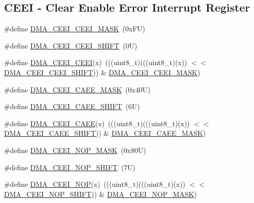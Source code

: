 \subsection*{C\+E\+EI -\/ Clear Enable Error Interrupt Register}
\begin{DoxyCompactItemize}
\item 
\#define \mbox{\hyperlink{group___d_m_a___register___masks_gaac1e3fb6ff551f58fe6c43c5b10a6186}{D\+M\+A\+\_\+\+C\+E\+E\+I\+\_\+\+C\+E\+E\+I\+\_\+\+M\+A\+SK}}~(0x\+F\+U)
\item 
\#define \mbox{\hyperlink{group___d_m_a___register___masks_ga66ffe3efeb446f55654d3ac90abf1cb6}{D\+M\+A\+\_\+\+C\+E\+E\+I\+\_\+\+C\+E\+E\+I\+\_\+\+S\+H\+I\+FT}}~(0\+U)
\item 
\#define \mbox{\hyperlink{group___d_m_a___register___masks_gaf1db6175a973e40e11a4ac87ee231096}{D\+M\+A\+\_\+\+C\+E\+E\+I\+\_\+\+C\+E\+EI}}(x)~(((uint8\+\_\+t)(((uint8\+\_\+t)(x)) $<$$<$ \mbox{\hyperlink{group___d_m_a___register___masks_ga66ffe3efeb446f55654d3ac90abf1cb6}{D\+M\+A\+\_\+\+C\+E\+E\+I\+\_\+\+C\+E\+E\+I\+\_\+\+S\+H\+I\+FT}})) \& \mbox{\hyperlink{group___d_m_a___register___masks_gaac1e3fb6ff551f58fe6c43c5b10a6186}{D\+M\+A\+\_\+\+C\+E\+E\+I\+\_\+\+C\+E\+E\+I\+\_\+\+M\+A\+SK}})
\item 
\#define \mbox{\hyperlink{group___d_m_a___register___masks_ga386c3018389f0adce8b163c90bc171b7}{D\+M\+A\+\_\+\+C\+E\+E\+I\+\_\+\+C\+A\+E\+E\+\_\+\+M\+A\+SK}}~(0x40\+U)
\item 
\#define \mbox{\hyperlink{group___d_m_a___register___masks_ga389695175eaab975f78ed66669e467df}{D\+M\+A\+\_\+\+C\+E\+E\+I\+\_\+\+C\+A\+E\+E\+\_\+\+S\+H\+I\+FT}}~(6\+U)
\item 
\#define \mbox{\hyperlink{group___d_m_a___register___masks_gab4d8578d0b4f25e873beb3311698ec19}{D\+M\+A\+\_\+\+C\+E\+E\+I\+\_\+\+C\+A\+EE}}(x)~(((uint8\+\_\+t)(((uint8\+\_\+t)(x)) $<$$<$ \mbox{\hyperlink{group___d_m_a___register___masks_ga389695175eaab975f78ed66669e467df}{D\+M\+A\+\_\+\+C\+E\+E\+I\+\_\+\+C\+A\+E\+E\+\_\+\+S\+H\+I\+FT}})) \& \mbox{\hyperlink{group___d_m_a___register___masks_ga386c3018389f0adce8b163c90bc171b7}{D\+M\+A\+\_\+\+C\+E\+E\+I\+\_\+\+C\+A\+E\+E\+\_\+\+M\+A\+SK}})
\item 
\#define \mbox{\hyperlink{group___d_m_a___register___masks_ga5b85e28933ce4120f8a8542972b92115}{D\+M\+A\+\_\+\+C\+E\+E\+I\+\_\+\+N\+O\+P\+\_\+\+M\+A\+SK}}~(0x80\+U)
\item 
\#define \mbox{\hyperlink{group___d_m_a___register___masks_gaa6681149d6d175500734c3ae71842eba}{D\+M\+A\+\_\+\+C\+E\+E\+I\+\_\+\+N\+O\+P\+\_\+\+S\+H\+I\+FT}}~(7\+U)
\item 
\#define \mbox{\hyperlink{group___d_m_a___register___masks_ga2a97cec137f51555ce182a676d0282f7}{D\+M\+A\+\_\+\+C\+E\+E\+I\+\_\+\+N\+OP}}(x)~(((uint8\+\_\+t)(((uint8\+\_\+t)(x)) $<$$<$ \mbox{\hyperlink{group___d_m_a___register___masks_gaa6681149d6d175500734c3ae71842eba}{D\+M\+A\+\_\+\+C\+E\+E\+I\+\_\+\+N\+O\+P\+\_\+\+S\+H\+I\+FT}})) \& \mbox{\hyperlink{group___d_m_a___register___masks_ga5b85e28933ce4120f8a8542972b92115}{D\+M\+A\+\_\+\+C\+E\+E\+I\+\_\+\+N\+O\+P\+\_\+\+M\+A\+SK}})
\end{DoxyCompactItemize}
